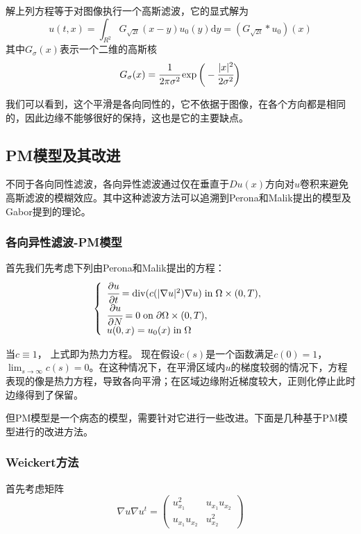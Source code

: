 \documentclass[a4paper,12pt]{article}
\begin{document}
解上列方程等于对图像执行一个高斯滤波，它的显式解为
\begin{displaymath}
u(t,x)=\int_{R^2}G_{\sqrt{2t}}(x-y)u_0(y)\mathrm{d}y=(G_{\sqrt{2t}}*u_0)(x)
\end{displaymath}
其中$G_{\sigma}(x)$表示一个二维的高斯核$$G_{\sigma}(x)=\cfrac{1}{2\pi\sigma^2}\exp{\bigg{(}-\cfrac{|x|^2}{2\sigma^2}\bigg{)}}$$

我们可以看到，这个平滑是各向同性的，它不依据于图像，在各个方向都是相同的，因此边缘不能够很好的保持，这也是它的主要缺点。

\subsection{PM模型及其改进}
不同于各向同性滤波，各向异性滤波通过仅在垂直于$Du(x)$方向对$u$卷积来避免高斯滤波的模糊效应。其中这种滤波方法可以追溯到Perona和Malik提出的模型\cite{perona1990scale}及Gabor提到的理论\cite{lindenbaum1994gabor}。

\subsubsection{各向异性滤波-PM模型}
首先我们先考虑下列由Perona和Malik提出的方程：
\begin{displaymath}
\left\{\begin{array}{lll}
\cfrac{\partial u}{\partial t}=\mathrm{div}(c(|\nabla u|^2)\nabla u) \; \mathrm{in}\; \Omega\times(0,T),\\
\cfrac{\partial u}{\partial N}=0\; \mathrm{on}\; \partial{\Omega}\times(0,T),\\
u(0,x)=u_0(x) \; \mathrm{in}\; \Omega
\end{array}\right.
\end{displaymath}

当$c\equiv1$， 上式即为热力方程。 现在假设$c(s)$是一个函数满足$c(0)=1$，$\lim_{s\rightarrow\infty}c(s)=0$。在这种情况下，在平滑区域内$u$的梯度较弱的情况下，方程表现的像是热力方程，导致各向平滑；在区域边缘附近梯度较大，正则化停止此时边缘得到了保留。

但PM模型是一个病态的模型，需要针对它进行一些改进。下面是几种基于PM模型进行的改进方法。

\subsubsection{Weickert方法\cite{weickert1998anisotropic}}
首先考虑矩阵
\begin{displaymath}
\nabla u\nabla u^t=
\begin{pmatrix}
u_{x_1}^2 & u_{x_1}u_{x_2}\\
u_{x_1}u_{x_2} & u_{x_2}^2
\end{pmatrix}
\end{displaymath}
\end{document}
